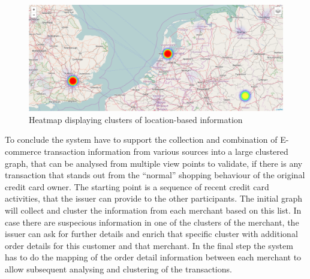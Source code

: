 \begin{figure}[H]
  \centering
  \includegraphics[width=0.9\columnwidth]{images/Heatmap.png}
  \caption{Heatmap displaying clusters of location-based information}
\label{fig:images_map_heatmap}
\end{figure}

To conclude the system have to support the collection and combination of \gls{E-commerce} transaction information from various sources into a large clustered graph, that can be analysed from multiple view points to validate, if there is any transaction that stands out from the ``normal'' shopping behaviour of the original credit card owner. The starting point is a sequence of recent credit card activities, that the issuer can provide to the other participants. The initial graph will collect and cluster the information from each merchant based on this list. In case there are suspecious information in one of the clusters of the merchant, the issuer can ask for further details and enrich that specific cluster with additional order details for this customer and that merchant. In the final step the system has to do the mapping of the order detail information between each merchant to allow subsequent analysing and clustering of the transactions.

